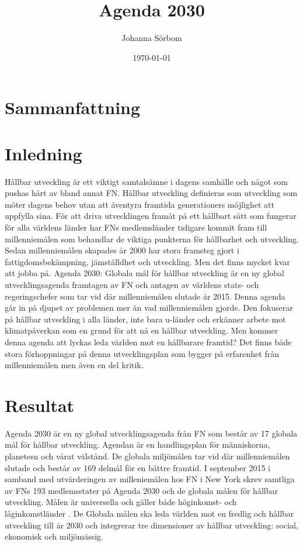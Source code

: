 \documentclass{report}
\title{Agenda 2030}
\date{\today}
\author{Johanna Sörbom}
\begin{document}
\maketitle
\newpage
\tableofcontents
\newpage
\section*{Sammanfattning}
\newpage
\section{Inledning}
Hållbar utveckling är ett viktigt samtalsämne i dagens samhälle och något som pushas hårt av bland annat FN. Hållbar utveckling definieras som utveckling som möter dagens behov utan att äventyra framtida generationers möjlighet att uppfylla sina.\cite{web2030agenda}
För att driva utvecklingen framåt på ett hållbart sätt som fungerar för alla världens länder har FNs medlemsländer tidigare kommit fram till millenniemålen som behandlar de viktiga punkterna för hållbarhet och utveckling.  Sedan millenniemålen skapades år 2000 har stora framsteg gjort i fattigdomsbekämpning, jämställdhet och utveckling. Men det finns mycket kvar att jobba på. \cite{webEuropeanComission}
Agenda 2030: Globala mål för hållbar utveckling är en ny global utvecklingsagenda framtagen av FN och antagen av världens stats- och regeringschefer som tar vid där millenniemålen slutade år 2015. Denna agenda går in på djupet av problemen mer än vad millenniemålen gjorde. Den fokuserar på hållbar utveckling i alla länder, inte bara u-länder och erkänner arbete mot klimatpåverkan som en grund för att nå en hållbar utveckling. Men kommer denna agenda att lyckas leda världen mot en hållbarare framtid? Det finns både stora förhoppningar på denna utvecklingsplan som bygger på erfarenhet från millenniemålen men även en del kritik. 

\section{Resultat}
Agenda 2030 är en ny global utvecklingsagenda från FN som består av 17 globala mål för hållbar utveckling. \cite{webUNASweden} Agendan\cite{nam2015transforming} är en handlingsplan för människorna, planetesn och vårat välstånd. De globala miljömålen tar vid där millenniemålen slutade och består av 169 delmål för en bättre framtid. I september 2015 i samband med utvärderingen av milleniemålen hos FN i New York skrev samtliga av FNs 193 medlemsstater på Agenda 2030 och de globala målen för hållbar utveckling.\cite{webUNASweden} Målen är universella och gäller både höginkomst- och låginkomstländer \cite{webUNDP}. De Globala målen ska leda världen mot en fredlig och hållbar utveckling till år 2030 och integrerar tre dimensioner av hållbar utveckling: social, ekonomisk och miljömässig.  \cite{UNA Sweden}
\end{document}
